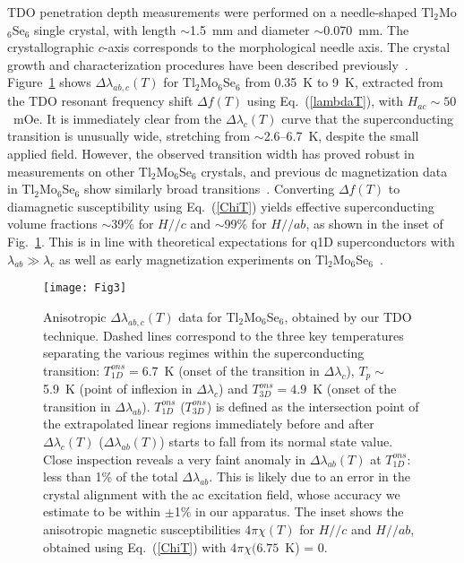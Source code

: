 \documentclass[prb,twocolumn,showpacs,preprintnumbers,amsmath,amssymb,floatfix,groupedaddress,superscriptaddress,aps,10pt]{revtex4-1}
\newcommand{\Tl}{Tl$_2$Mo$_6$Se$_6$}
\begin{document}
TDO penetration depth measurements were performed on a needle-shaped Tl$_2$Mo$_6$Se$_6$ single crystal, with length $\sim$1.5~mm and diameter $\sim$0.070~mm. The crystallographic $c$-axis corresponds to the morphological needle axis.  The crystal growth and characterization procedures have been described previously~\cite{Potel1980,Petrovic2010}. Figure~\ref{Fig3} shows $\Delta\lambda_{ab,c}(T)$ for Tl$_2$Mo$_6$Se$_6$ from 0.35~K to 9~K, extracted from the TDO resonant frequency shift $\Delta f(T)$ using Eq.~(\ref{lambdaT}), with $H_{ac}\sim50$~mOe.  It is immediately clear from the $\Delta\lambda_c(T)$ curve that the superconducting transition is unusually wide, stretching from $\sim$2.6--6.7~K, despite the small applied field. However, the observed transition width has proved robust in measurements on other {\Tl} crystals, and previous dc magnetization data in Tl$_2$Mo$_6$Se$_6$ show similarly broad transitions~\cite{Bergk2011}.  Converting $\Delta f(T)$ to diamagnetic susceptibility using Eq.~(\ref{ChiT}) yields effective superconducting volume fractions $\sim$39\% for $H/\!/c$ and $\sim$99\% for $H/\!/ab$, as shown in the inset of Fig.~\ref{Fig3}. This is in line with theoretical expectations for q1D superconductors with $\lambda_{ab}\gg\lambda_c$ as well as early magnetization experiments on Tl$_2$Mo$_6$Se$_6$~\cite{Brusetti1988a}.

\begin{figure}[tbp]
	\centering 
	\texttt{[image: Fig3]}
	\caption{\label{Fig3} Anisotropic $\Delta\lambda_{ab,c}(T)$ data for Tl$_2$Mo$_6$Se$_6$, obtained by our TDO technique. Dashed lines correspond to the three key temperatures separating the various regimes within the superconducting transition: $T_{1D}^{ons}=6.7$~K (onset of the transition in $\Delta\lambda_c$), $T_p\sim$ 5.9~K (point of inflexion in $\Delta\lambda_c$) and $T_{3D}^{ons}=4.9$~K (onset of the transition in $\Delta\lambda_{ab}$). $T_{1D}^{ons}$ ($T_{3D}^{ons}$) is defined as the intersection point of the extrapolated linear regions immediately before and after $\Delta\lambda_{c}(T)$ ($\Delta\lambda_{ab}(T)$) starts to fall from its normal state value.  Close inspection reveals a very faint anomaly in $\Delta\lambda_{ab}(T)$ at $T_{1D}^{ons}$: less than 1\% of the total $\Delta\lambda_{ab}$.  This is likely due to an error in the crystal alignment with the ac excitation field, whose accuracy we estimate to be within $\pm$1\% in our apparatus. The inset shows the anisotropic magnetic susceptibilities $4\pi\chi(T)$ for $H/\!/c$ and $H/\!/ab$, obtained using Eq.~(\ref{ChiT}) with $4\pi \chi(6.75$~K) = 0.  }
\end{figure}
\end{document}
